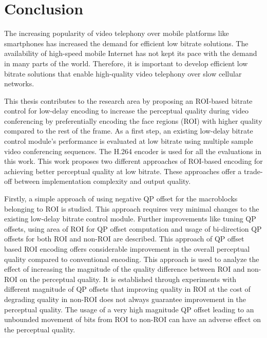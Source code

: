 \chapter{Conclusion} \label{chapter:conclusion}
\thispagestyle{empty}%

The increasing popularity of video telephony over mobile platforms like smartphones has increased the demand for efficient low bitrate solutions. The availability of high-speed mobile Internet has not kept its pace with the demand in many parts of the world. Therefore, it is important to develop efficient low bitrate solutions that enable high-quality video telephony over slow cellular networks. 

This thesis contributes to the research area by proposing an ROI-based bitrate control for low-delay encoding to increase the perceptual quality during video conferencing by preferentially encoding the face regions (ROI) with higher quality compared to the rest of the frame. As a first step, an existing low-delay bitrate control module's performance is evaluated at low bitrate using multiple sample video conferencing sequences. The H.264 encoder is used for all the evaluations in this work. This work proposes two different approaches of ROI-based encoding for achieving better perceptual quality at low bitrate. These approaches offer a trade-off between implementation complexity and output quality. 

Firstly, a simple approach of using negative QP offset for the macroblocks belonging to ROI is studied. This approach requires very minimal changes to the existing low-delay bitrate control module. Further improvements like tuning QP offsets, using area of ROI for QP offset computation and usage of bi-direction QP offsets for both ROI and non-ROI are described. This approach of QP offset based ROI encoding offers considerable improvement in the overall perceptual quality compared to conventional encoding. This approach is used to analyze the effect of increasing the magnitude of the quality difference between ROI and non-ROI on the perceptual quality. It is established through experiments with different magnitude of QP offsets that improving quality in ROI at the cost of degrading quality in non-ROI does not always guarantee improvement in the perceptual quality. The usage of a very high magnitude QP offset leading to an unbounded movement of bits from ROI to non-ROI can have an adverse effect on the perceptual quality.

